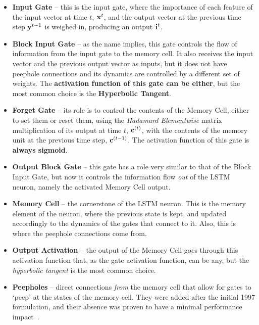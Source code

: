 \begin{itemize}
    \item \textbf{Input Gate} -- this is the input gate, where the importance of each feature of the input vector at time $t$, $\mathbf{x}^t$, and the output vector at the previous time step $\mathbf{y}^{t-1}$ is weighed in, producing an output $\mathbf{i}^{t}$.

    \item \textbf{Block Input Gate} -- as the name implies, this gate controls the flow of information from the input gate to the memory cell. It also receives the input vector and the previous output vector as inputs, but it does not have peephole connections and its dynamics are controlled by a different set of weights. The \textbf{activation function of this gate can be either}, but the most common choice is the \textbf{Hyperbolic Tangent}.

    \item \textbf{Forget Gate} -- its role is to control the contents of the Memory Cell, either to set them or reset them, using the \textit{Hadamard Elementwise} matrix multiplication of its output at time $t$, $\mathbf{c}^{(t)}$, with the contents of the memory unit at the previous time step, $\mathbf{c}^{(t-1)}$. The activation function of this gate is \textbf{always sigmoid}.

    \item \textbf{Output Block Gate} -- this gate has a role very similar to that of the Block Input Gate, but now it controls the information flow \textit{out} of the LSTM neuron, namely the activated Memory Cell output.

    \item \textbf{Memory Cell} -- the cornerstone of the LSTM neuron. This is the memory element of the neuron, where the previous state is kept, and updated accordingly to the dynamics of the gates that connect to it. Also, this is where the peephole connections come from. 

    \item \textbf{Output Activation} -- the output of the Memory Cell goes through this activation function that, as the gate activation function, can be any, but the \textit{hyperbolic tangent} is the most common choice.

    \item \textbf{Peepholes} -- direct connections \textit{from} the memory cell that allow for gates to `peep' at the states of the memory cell. They were added after the initial 1997 formulation, and their absence was proven to have a minimal performance impact~\cite{Greff15}.
\end{itemize}

